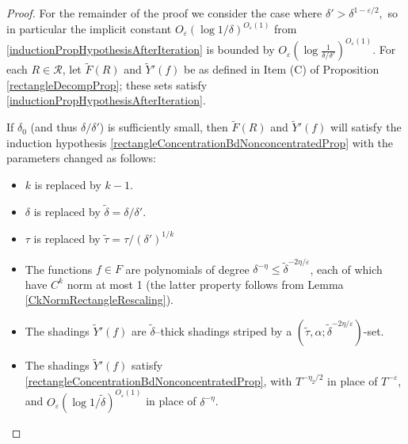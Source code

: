 \documentclass[10pt,a4paper]{amsart}
\newcommand{\eps}{\varepsilon}
\begin{document}
\begin{proof}
For the remainder of the proof we consider the case where $\delta'>\delta^{1-\eps/2},$ so in particular the implicit constant $O_{\eps}(\log 1/\delta)^{O_\eps(1)}$ from \eqref{inductionPropHypothesisAfterIteration} is bounded by $O_{\eps}(\log \frac{1}{\delta/\delta'})^{O_\eps(1)}$. For each $R\in\mathcal{R}$, let $\tilde F(R)$ and $\tilde Y'(f)$ be as defined in Item (C) of Proposition \ref{rectangleDecompProp}; these sets satisfy \eqref{inductionPropHypothesisAfterIteration}.

If $\delta_0$ (and thus $\delta/\delta'$) is sufficiently small, then $\tilde F(R)$ and $\tilde Y'(f)$ will satisfy the induction hypothesis \eqref{rectangleConcentrationBdNonconcentratedProp} with the parameters changed as follows:
\begin{itemize}
\item $k$ is replaced by $k-1$.
\item $\delta$ is replaced by $\tilde\delta = \delta/\delta'$.
\item $\tau$ is replaced by $\tilde\tau = \tau/(\delta')^{1/k}$
\item The functions $f\in F$ are polynomials of degree $\delta^{-\eta} \leq \tilde\delta^{-2\eta/\eps}$, each of which have $C^k$ norm at most 1 (the latter property follows from Lemma \ref{CkNormRectangleRescaling}).
\item The shadings $\tilde Y'(f)$ are $\tilde\delta$--thick shadings striped by a $(\tilde\tau,\alpha;\tilde\delta^{-2\eta/\eps})$-set.
\item The shadings $\tilde Y'(f)$ satisfy \eqref{rectangleConcentrationBdNonconcentratedProp}, with $T^{-\eta_2/2}$ in place of $T^{-\eps}$, and $O_{\eps}(\log 1/\tilde\delta)^{O_\eps(1)}$ in place of $\delta^{-\eta}$.
\end{itemize}


\end{proof}
\end{document}
